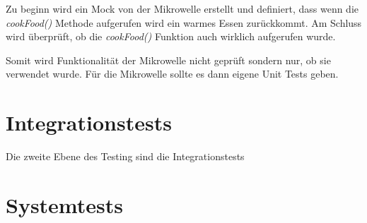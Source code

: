 Zu beginn wird ein Mock von der Mikrowelle erstellt und definiert, dass wenn die \textit{cookFood()} Methode aufgerufen wird ein warmes Essen zurückkommt. Am Schluss wird überprüft, ob die \textit{cookFood()} Funktion auch wirklich aufgerufen wurde.

Somit wird Funktionalität der Mikrowelle nicht geprüft sondern nur, ob sie verwendet wurde. Für die Mikrowelle sollte es dann eigene Unit Tests geben.

\section{Integrationstests}
Die zweite Ebene des Testing sind die Integrationstests

\section{Systemtests}